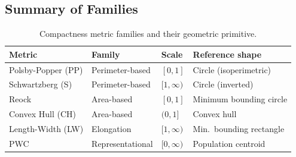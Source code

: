 \subsection{Summary of Families}

\begin{table}[h]
\centering
\caption{Compactness metric families and their geometric primitive.}
\label{tab:families}
\begin{tabular}{llll}
\toprule
Metric & Family & Scale & Reference shape \\
\midrule
Polsby-Popper (PP) & Perimeter-based & $[0,1]$ & Circle (isoperimetric) \\
Schwartzberg (S)   & Perimeter-based & $[1,\infty)$ & Circle (inverted) \\
Reock              & Area-based      & $[0,1]$ & Minimum bounding circle \\
Convex Hull (CH)   & Area-based      & $(0,1]$ & Convex hull \\
Length-Width (LW)  & Elongation      & $[1,\infty)$ & Min.\ bounding rectangle \\
PWC                & Representational & $[0,\infty)$ & Population centroid \\
\bottomrule
\end{tabular}
\end{table}
